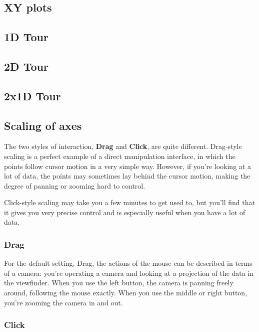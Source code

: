 \documentclass[11pt]{article}
\begin{document}
\subsection{XY plots}

\subsection{1D Tour}
\label{slbl:1DTour}

\subsection{2D Tour}
\label{slbl:2DTour}

\subsection{2x1D Tour}
\label{slbl:2x1DTour}

\subsection{Scaling of axes}
\label{slbl:Scaling}

The two styles of interaction, {\bf Drag} and {\bf Click}, are quite
different.  Drag-style scaling is a perfect example of a direct
manipulation interface, in which the points follow cursor motion in a
very simple way.  However, if you're looking at a lot of data, the
points may sometimes lay behind the cursor motion, making the degree
of panning or zooming hard to control.

Click-style scaling may take you a few minutes to get used to, but
you'll find that it gives you very precise control and is especially
useful when you have a lot of data.

\subsubsection{Drag}

For the default setting, Drag, the actions of the mouse can be
described in terms of a camera:  you're operating a camera and
looking at a projection of the data in the viewfinder.  When you use
the left button, the camera is panning freely around, following the
mouse exactly.  When you use the middle or right button, you're
zooming the camera in and out.

\subsubsection{Click}
\end{document}
